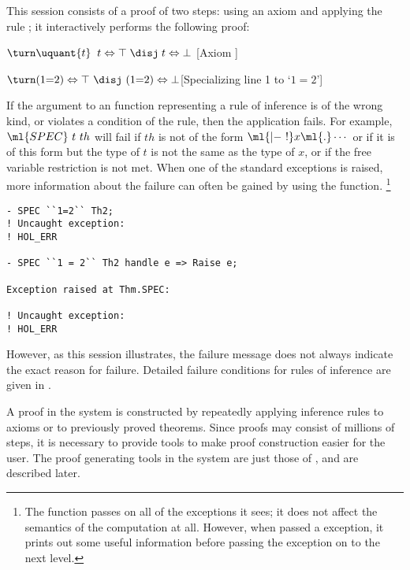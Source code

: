 This session consists of a proof of two steps: using an axiom and applying the rule ; it interactively performs the following proof:
\begin{samepage}
\begin{proofenumerate}
\item $ \turn \uquant{t}\;\; t\Leftrightarrow\top \;\disj\; t\Leftrightarrow\bot$ \hfill
[Axiom ]
\item $ \turn (1{=}2)\Leftrightarrow\top\ \disj\ (1{=}2)\Leftrightarrow\bot$\hfill [Specializing line 1 to `$1{=}2$']
\end{proofenumerate}
\end{samepage}

If the argument to an \ML{} function representing a rule of inference is of the wrong kind, or violates a condition of the rule, then the application fails.
For example, $\ml{SPEC}\ t\ th$ will fail if $th$ is not of the form $\ml{|-\ !}x\ml{.}\cdots$ or if it is of this form but the type of $t$ is not the same as the type of $x$, or if the free variable restriction is not met.
When one of the standard  exceptions is raised, more information about the failure can often be gained by using the  function.%
\footnote{The  function passes on all of the exceptions it sees; it does not affect the semantics of the computation at all.
However, when passed a  exception, it prints out some useful information before passing the exception on to the next level.}

\begin{session}
\begin{verbatim}
- SPEC ``1=2`` Th2;
! Uncaught exception:
! HOL_ERR

- SPEC ``1 = 2`` Th2 handle e => Raise e;

Exception raised at Thm.SPEC:

! Uncaught exception:
! HOL_ERR
\end{verbatim}
\end{session}
However, as this session illustrates, the failure message does not always indicate the exact reason for failure.
Detailed failure conditions for rules of inference are given in \REFERENCE.

A proof in the \HOL{} system is constructed by repeatedly applying inference rules to axioms or to previously proved theorems.
Since proofs may consist of millions of steps, it is necessary to provide tools to make proof construction easier for the user.
The proof generating tools in the \HOL{} system are just those of \LCF, and are described later.

